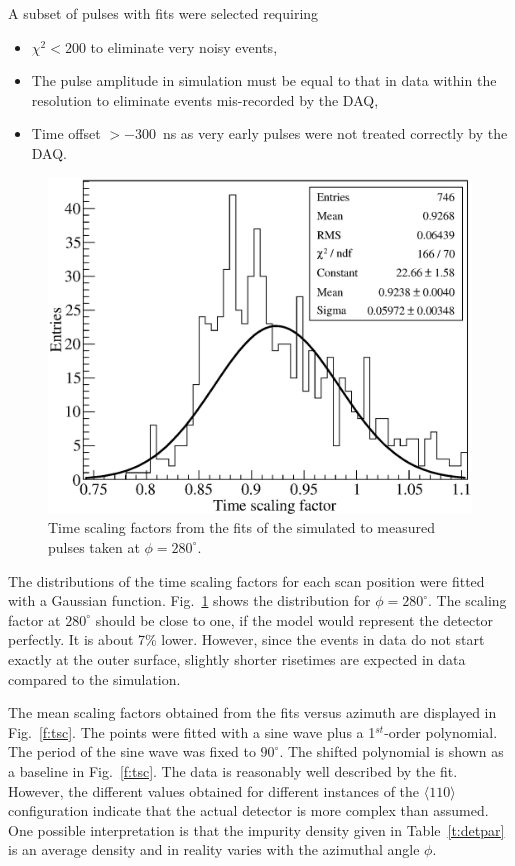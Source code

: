 \documentclass[epj]{svjour}
\begin{document}
A subset of pulses with fits were selected requiring
\begin{itemize}
\item $\chi^{2} < 200$ to eliminate very noisy events,
\item The pulse amplitude in simulation must be equal to that in data
within the resolution to eliminate events mis-recorded by the DAQ,
\item Time offset $> -300$~ns as very early pulses were not treated
correctly by the DAQ.
\end{itemize}

\begin{figure}\centering
\includegraphics[width=0.9\linewidth]{tscale280}
\caption{Time scaling factors from the fits of the simulated to
measured pulses taken at $\phi=280^{\circ}$.}
\label{f:ts280}
\end{figure}

The distributions of the time scaling factors for each scan position
were fitted with a Gaussian function. Fig.~\ref{f:ts280} shows the
distribution for $\phi = 280^{\circ}$. The scaling factor at
$280^{\circ}$ should be close to one, if the model would represent the
detector perfectly. It is about 7\% lower. However, since the events
in data do not start exactly at the outer surface, slightly shorter
risetimes are expected in data compared to the simulation.

The mean scaling factors obtained from the fits versus azimuth are
displayed in Fig.~\ref{f:tsc}. The points were fitted with a sine wave
plus a 1$^{st}$-order polynomial. The period of the sine wave was
fixed to $90^{\circ}$. The shifted polynomial is shown as a baseline
in Fig.~\ref{f:tsc}. The data is reasonably well described by the
fit. However, the different values obtained for different instances of
the $\langle 110 \rangle$ configuration indicate that the actual
detector is more complex than assumed. One possible interpretation is
that the impurity density given in Table~\ref{t:detpar} is an average
density and in reality varies with the azimuthal angle $\phi$.
\end{document}
